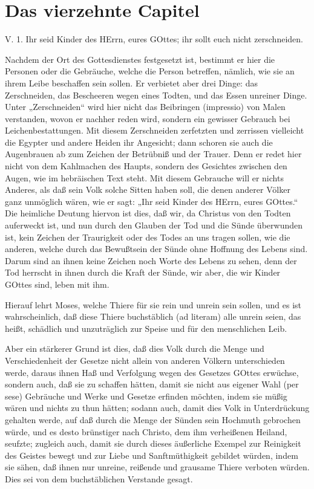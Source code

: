 \section{Das vierzehnte Capitel}

\begin{schriftzitat}
V. 1. Ihr seid Kinder des HErrn, eures GOttes; ihr sollt euch nicht zerschneiden.
\end{schriftzitat}

Nachdem der Ort des Gottesdienstes festgesetzt ist, bestimmt er hier die Personen oder die Gebräuche, welche die Person betreffen, nämlich, wie sie an ihrem Leibe beschaffen sein sollen. Er verbietet aber drei Dinge: das Zerschneiden, das Bescheeren wegen eines Todten, und das Essen unreiner Dinge. Unter „Zerschneiden“ wird hier nicht das Beibringen (impressio) von Malen verstanden, wovon er nachher reden wird, sondern ein gewisser Gebrauch bei Leichenbestattungen. Mit diesem Zerschneiden zerfetzten und zerrissen vielleicht die Egypter und andere Heiden ihr Angesicht; dann schoren sie auch die Augenbrauen ab zum Zeichen der Betrübniß und der Trauer. Denn er redet hier nicht von dem Kahlmachen des Haupts, sondern des Gesichtes zwischen den Augen, wie im hebräischen Text steht. Mit diesem Gebrauche will er nichts Anderes, als daß sein Volk solche Sitten haben soll, die denen anderer Völker ganz unmöglich wären, wie er sagt: „Ihr seid Kinder des HErrn, eures GOttes.“ Die heimliche Deutung hiervon ist dies, daß wir, da Christus von den Todten auferweckt ist, und nun durch den Glauben der Tod und die Sünde überwunden ist, kein Zeichen der Traurigkeit oder des Todes an uns tragen sollen, wie die anderen, welche durch das Bewußtsein der Sünde ohne Hoffnung des Lebens sind. Darum sind an ihnen keine Zeichen noch Worte des Lebens zu sehen, denn der Tod herrscht in ihnen durch die Kraft der Sünde, wir aber, die wir Kinder GOttes sind, leben mit ihm.

Hierauf lehrt Moses, welche Thiere für sie rein und unrein sein sollen, und es ist wahrscheinlich, daß diese Thiere buchstäblich (ad literam) alle unrein seien, das heißt, schädlich und unzuträglich zur Speise und für den menschlichen Leib.

Aber ein stärkerer Grund ist dies, daß dies Volk durch die Menge und Verschiedenheit der Gesetze nicht allein von anderen Völkern unterschieden werde, daraus ihnen Haß und Verfolgung wegen des Gesetzes GOttes erwüchse, sondern auch, daß sie zu schaffen hätten, damit sie nicht aus eigener Wahl (per sese) Gebräuche und Werke und Gesetze erfinden möchten, indem sie müßig wären und nichts zu thun hätten; sodann auch, damit dies Volk in Unterdrückung gehalten werde, auf daß durch die Menge der Sünden sein Hochmuth gebrochen würde, und es desto brünstiger nach Christo, dem ihm verheißenen Heiland, seufzte; zugleich auch, damit sie durch dieses äußerliche Exempel zur Reinigkeit des Geistes bewegt und zur Liebe und Sanftmüthigkeit gebildet würden, indem sie sähen, daß ihnen nur unreine, reißende und grausame Thiere verboten würden. Dies sei von dem buchstäblichen Verstande gesagt.

